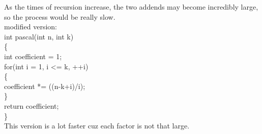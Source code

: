 \documentclass[11pt, a4paper, UTF8]{ctexart}
\begin{document}
\begin{solution}
  As the times of recursion increase, the two addends may become incredibly large, 
  so the process would be really slow.\\
  modified version:\\
  \indent int pascal(int n, int k)\\
  \indent \{\\
  \indent \indent int coefficient = 1;\\
  \indent \indent for(int i = 1, i <= k, ++i)\\
  \indent \indent \{\\
  \indent \indent \indent coefficient *= ((n-k+i)/i);\\
  \indent \indent \}\\
  \indent \indent return coefficient;\\
  \indent \}\\
  This version is a lot faster cuz each factor is not that large.
\end{solution}




\end{document}
